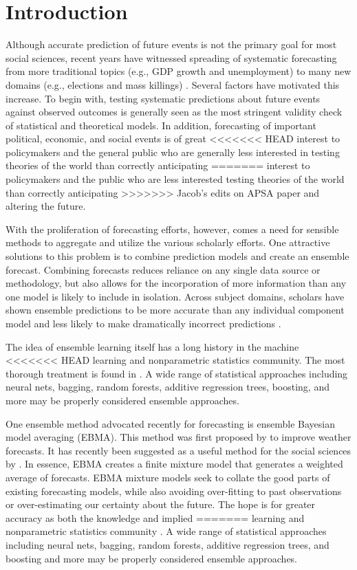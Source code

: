 \documentclass[12pt,fullpage,endnotes]{article}
\begin{document}
\doublespacing


\setcounter{page}{1}

\section{Introduction}
Although accurate prediction of future events is not the primary goal
for most social sciences, recent years have witnessed spreading of
systematic forecasting from more traditional topics (e.g., GDP growth
and unemployment) to many new domains (e.g., elections and mass
killings) .  Several factors have motivated this increase.  To begin
with, testing systematic predictions about future events against
observed outcomes is generally seen as the most stringent validity
check of statistical and theoretical models.  In addition, forecasting
of important political, economic, and social events is of great
<<<<<<< HEAD
interest to policymakers and the general public who are generally less
interested in testing theories of the world than correctly anticipating
=======
interest to policymakers and the public who are less
interested testing theories of the world than correctly anticipating
>>>>>>> Jacob's edits on APSA paper
and altering the future.

With the proliferation of forecasting efforts, however, comes a need
for sensible methods to aggregate and utilize the various scholarly
efforts.  One attractive solutions to this problem is to combine
prediction models and create an ensemble forecast.  Combining
forecasts reduces reliance on any single data source or methodology,
but also allows for the incorporation of more information than any one
model is likely to include in isolation.  Across subject domains,
scholars have shown ensemble predictions to be more accurate than any
individual component model and less likely to make dramatically
incorrect predictions \citep{Bates:1969,Armstrong:2001,Raftery:2005}.

The idea of ensemble learning itself has a long history in the machine
<<<<<<< HEAD
learning and nonparametric statistics community. The most thorough
treatment is found in \citet{Hastie:2009}. A wide range of statistical
approaches including neural nets, bagging, random forests, additive
regression trees, boosting, and more may be properly considered
ensemble approaches.  

One ensemble method advocated recently for forecasting is ensemble
Bayesian model averaging (EBMA). This method was first proposed by
\citet{Raftery:2005} to improve weather forecasts. It has recently been suggested as a useful method for the
social sciences by \citet{mhw:2012}. In essence, EBMA creates a
finite mixture model that generates a weighted average of
forecasts.  EBMA mixture models seek to collate the good parts of
existing forecasting models, while also avoiding over-fitting to past
observations or over-estimating our certainty about the future.  The
hope is for greater accuracy as both the knowledge and implied
=======
learning and nonparametric statistics community \citet{Hastie:2009}. A
wide range of statistical approaches including neural nets, bagging,
random forests, additive regression trees, and boosting and more may
be properly considered ensemble approaches.
\end{document}
